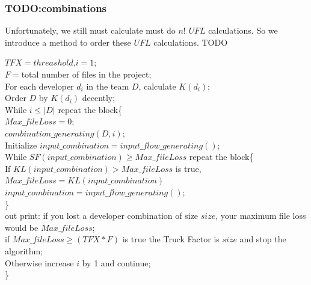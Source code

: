 \documentclass[12pt, a4paper, openright]{report}
\begin{document}
\subsubsection{TODO:combinations}
Unfortunately, we still must calculate must do $n!$ $UFL$ calculations. So we introduce a method to order these $UFL$ calculations.
TODO
\begin{algorithm}
	\SetAlgoLined
\end{algorithm}
\begin{raggedright}
	\scriptsize
	$TFX = threashold$,$i=1$;\\
	$F=$total number of files in the project;\\
	For each developer $d_i$ in the team $D$, calculate $K(d_i)$;\\
	Order $D$ by $K(d_i)$ decently;\\
	While $i\leq |D|$ repeat the block\{\\
	$Max\_fileLoss =0$;\\
	$combination\_generating(D,i)$;\\
	Initialize $input\_combination = input\_flow\_generating()$;\\
	While $SF(input\_combination)\geq Max\_fileLoss$ repeat the block\{\\
	If $KL(input\_combination) > Max\_fileLoss$ is true, $Max\_fileLoss=KL(input\_combination)$
	$input\_combination = input\_flow\_generating()$;\\
	\}\\
	out print: if you lost a developer combination of size $size$, your maximum file loss would be $Max\_fileLoss$;\\
	if $Max\_fileLoss \geq (TFX*F)$ is true the Truck Factor is $size$ and stop the algorithm;\\
	Otherwise increase $i$ by 1 and continue;\\
	\}\\
\end{raggedright}
\end{document}
